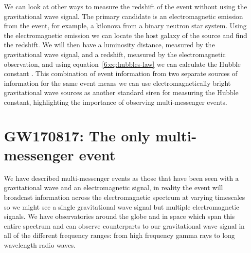 We can look at other ways to measure the redshift of the event without using the gravitational wave signal. The primary candidate is an electromagnetic emission from the event, for example, a kilonova from a binary neutron star system. Using the electromagnetic emission we can locate the host galaxy of the source and find the redshift. We will then have a luminosity distance, measured by the gravitational wave signal, and a redshift, measured by the electromagnetic observation, and using equation~\ref{6:eq:hubbles-law} we can calculate the Hubble constant . This combination of event information from two separate sources of information for the same event means we can use electromagnetically bright gravitational wave sources as another standard siren for measuring the Hubble constant, highlighting the importance of observing multi-messenger events.

\section{\label{6:sec:gw170817}GW170817: The only multi-messenger event}

We have described multi-messenger events as those that have been seen with a gravitational wave and an electromagnetic signal, in reality the event will broadcast information across the electromagnetic spectrum at varying timescales so we might see a single gravitational wave signal but multiple electromagnetic signals. We have observatories around the globe and in space which span this entire spectrum and can observe counterparts to our gravitational wave signal in all of the different frequency ranges: from high frequency gamma rays to long wavelength radio waves. 

